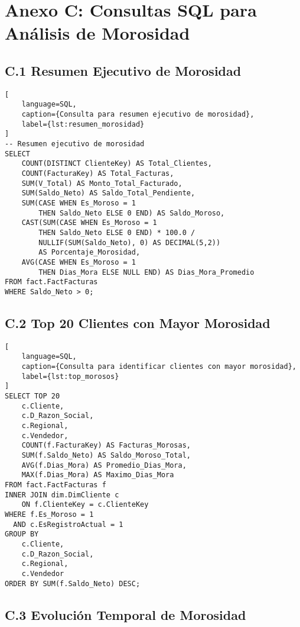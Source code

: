 \section{Anexo C: Consultas SQL para Análisis de Morosidad}

\subsection{C.1 Resumen Ejecutivo de Morosidad}

\begin{lstlisting}[
    language=SQL,
    caption={Consulta para resumen ejecutivo de morosidad},
    label={lst:resumen_morosidad}
]
-- Resumen ejecutivo de morosidad
SELECT 
    COUNT(DISTINCT ClienteKey) AS Total_Clientes,
    COUNT(FacturaKey) AS Total_Facturas,
    SUM(V_Total) AS Monto_Total_Facturado,
    SUM(Saldo_Neto) AS Saldo_Total_Pendiente,
    SUM(CASE WHEN Es_Moroso = 1 
        THEN Saldo_Neto ELSE 0 END) AS Saldo_Moroso,
    CAST(SUM(CASE WHEN Es_Moroso = 1 
        THEN Saldo_Neto ELSE 0 END) * 100.0 / 
        NULLIF(SUM(Saldo_Neto), 0) AS DECIMAL(5,2)) 
        AS Porcentaje_Morosidad,
    AVG(CASE WHEN Es_Moroso = 1 
        THEN Dias_Mora ELSE NULL END) AS Dias_Mora_Promedio
FROM fact.FactFacturas
WHERE Saldo_Neto > 0;
\end{lstlisting}

\subsection{C.2 Top 20 Clientes con Mayor Morosidad}

\begin{lstlisting}[
    language=SQL,
    caption={Consulta para identificar clientes con mayor morosidad},
    label={lst:top_morosos}
]
SELECT TOP 20
    c.Cliente,
    c.D_Razon_Social,
    c.Regional,
    c.Vendedor,
    COUNT(f.FacturaKey) AS Facturas_Morosas,
    SUM(f.Saldo_Neto) AS Saldo_Moroso_Total,
    AVG(f.Dias_Mora) AS Promedio_Dias_Mora,
    MAX(f.Dias_Mora) AS Maximo_Dias_Mora
FROM fact.FactFacturas f
INNER JOIN dim.DimCliente c 
    ON f.ClienteKey = c.ClienteKey
WHERE f.Es_Moroso = 1
  AND c.EsRegistroActual = 1
GROUP BY 
    c.Cliente, 
    c.D_Razon_Social, 
    c.Regional, 
    c.Vendedor
ORDER BY SUM(f.Saldo_Neto) DESC;
\end{lstlisting}

\subsection{C.3 Evolución Temporal de Morosidad}

